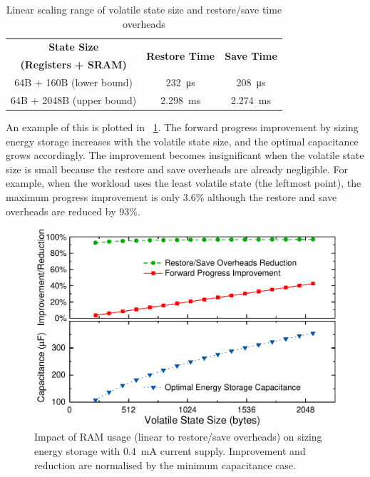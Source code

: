 
\begin{table}[!t]
    \renewcommand{\arraystretch}{1.2}
    \centering
    \caption{Linear scaling range of volatile state size and restore/save time overheads}
    \label{tab:ramscale}
    \begin{tabular}{|c|cc|}
    \hline
    \textbf{State Size} & \multirow{2}{*}{\textbf{Restore Time}} & \multirow{2}{*}{\textbf{Save Time}}\\
    \textbf{(Registers + SRAM)} & & \\
    \hline
    64B + 160B (lower bound) & \SI{232}{\micro\second} & \SI{208}{\micro\second}\\
    64B + 2048B (upper bound) & \SI{2.298}{\milli\second} & \SI{2.274}{\milli\second} \\
    \hline
    \end{tabular}
\end{table}

An example of this is plotted in \figurename{~\ref{fig:ram}}. The forward progress improvement by sizing energy storage increases with the volatile state size, and the optimal capacitance grows accordingly. The improvement becomes insignificant when the volatile state size is small because the restore and save overheads are already negligible. For example, when the workload uses the least volatile state (the leftmost point), the maximum progress improvement is only 3.6\% although the restore and save overheads are reduced by 93\%. 

\begin{figure}[!t]
    \centering
    \includegraphics[width=0.8\columnwidth]{ch3_sizingeffect/figures/RSTORAM3Fig}
    \caption{Impact of RAM usage (linear to restore/save overheads) on sizing energy storage with \SI{0.4}{\milli\ampere} current supply. Improvement and reduction are normalised by the minimum capacitance case. }
    \label{fig:ram}
\end{figure}
